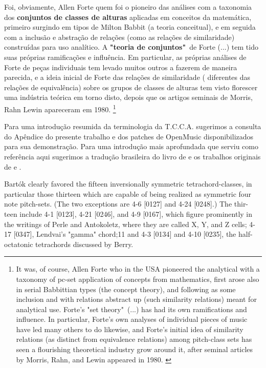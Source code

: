 \documentclass[
	12pt,				%
	openright,			%
	twoside,			%
	a4paper,			%
	english,			%
	french,				%
	spanish,			%
	brazil				%
	]{abntex2}
\begin{document}
\begin{citacao}
Foi, obviamente, Allen Forte quem foi o pioneiro das análises com a taxonomia dos \textbf{conjuntos de classes de alturas} aplicadas em conceitos da matemática, primeiro surgindo em tipos de Milton Babbit (a teoria conceitual), e em seguida com a inclusão e abstração de relações (como as relações de similaridade) construídas para uso analítico. A \textbf{"teoria de conjuntos"}\ de Forte (...) tem tido suas próprias ramificações e influência. Em particular, as próprias análises de Forte de peças individuais tem levado muitos outros a fazerem de maneira parecida, e a ideia inicial de Forte das relações de similaridade ( diferentes das relações de equivalência) sobre os grupos de classes de alturas tem visto florescer uma indústria teórica em torno disto, depois que os artigos seminais de Morris, Rahn  Lewin apareceram em 1980. \cite[ p. 130]{rahn2004swerve}\footnote{
It was, of course, Allen Forte who in the USA pioneered the analytical with a taxonomy of pc-set application of concepts from mathematics, first arose also in serial Babbittian types (the concept theory), and following as some inclusion and with relations abstract up (such similarity relations) meant for analytical use. Forte's "set theory"\  (...) has had its own ramifications and influence. In particular, Forte's own analyses of individual pieces of music have led many others to do likewise, and Forte's initial idea of similarity relations (as distinct from equivalence relations) among pitch-class sets has seen a flourishing theoretical industry grow around it, after seminal articles by Morris, Rahn, and Lewin appeared in 1980. \cite[ p. 130, grifo nossos]{rahn2004swerve}}
\end{citacao}

Para uma introdução resumida da terminologia da T.C.C.A. sugerimos a consulta do Apêndice do presente trabalho e dos patches de OpenMusic disponibilizados para sua demonstração. Para uma introdução mais aprofundada que serviu como referência aqui sugerimos a tradução brasileira do livro de  e os trabalhos originais de  e .

\begin{citacao}
Bartók clearly favored the fifteen inversionally
symmetric tetrachord-classes, in particular those thirteen which
are capable of being realized as symmetric four note pitch-sets.
(The two exceptions are 4-6 [0127] and 4-24 [0248].) The thir-
teen include 4-1 [0123], 4-21 [0246], and 4-9 [0167], which figure
prominently in the writings of Perle and Antokoletz, where
they are called X, Y, and Z cells; 4-17 [0347], Lendvai's
"gamma" chord;11 and 4-3 [0134] and 4-10 [0235], the half-
octatonic tetrachords discussed by Berry.
\cite{cohn1988inversional}
\end{citacao}
\end{document}

